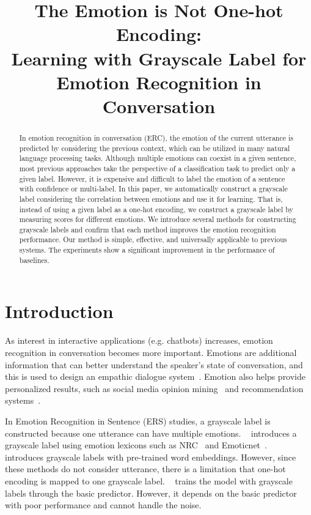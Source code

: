 \documentclass[a4paper]{article}
\title{The Emotion is Not One-hot Encoding:\\ Learning with Grayscale Label for Emotion Recognition in Conversation}
\begin{document}
\maketitle
\begin{abstract}
In emotion recognition in conversation (ERC), the emotion of the current utterance is predicted by considering the previous context, which can be utilized in many natural language processing tasks. Although multiple emotions can coexist in a given sentence, most previous approaches take the perspective of a classification task to predict only a given label. However, it is expensive and difficult to label the emotion of a sentence with confidence or multi-label. In this paper, we automatically construct a grayscale label considering the correlation between emotions and use it for learning. That is, instead of using a given label as a one-hot encoding, we construct a grayscale label by measuring scores for different emotions. We introduce several methods for constructing grayscale labels and confirm that each method improves the emotion recognition performance. Our method is simple, effective, and universally applicable to previous systems. The experiments show a significant improvement in the performance of baselines.
\end{abstract}

\section{Introduction}
As interest in interactive applications (e.g. chatbots) increases, emotion recognition in conversation becomes more important. Emotions are additional information that can better understand the speaker's state of conversation, and this is used to design an empathic dialogue system~\cite{ERC-research, li-etal-2020-shallow, Lin_Xu_2020}. Emotion also helps provide personalized results, such as social media opinion mining~\cite{chatterjee-etal-2019-semeval} and recommendation systems~\cite{10.1007/978-3-642-38061-7_18}.




In Emotion Recognition in Sentence (ERS) studies, a grayscale label is constructed because one utterance can have multiple emotions. ~\cite{ijcai2018-639} introduces a grayscale label using emotion lexicons such as NRC~\cite{mohammad2013nrc} and Emoticnet~\cite{poria2014emosenticspace}. ~\cite{li2021word} introduces grayscale labels with pre-trained word embeddings. However, since these methods do not consider utterance, there is a limitation that one-hot encoding is mapped to one grayscale label. ~\cite{Guo_Han_Han_Huang_Lu_2021} trains the model with grayscale labels through the basic predictor. However, it depends on the basic predictor with poor performance and cannot handle the noise.
\end{document}
